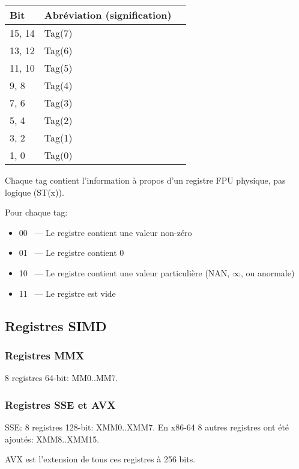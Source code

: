 \begin{center}
\begin{tabular}{ | l | l | l | }
\hline
Bit & Abréviation (signification) \\
\hline
15, 14 & Tag(7) \\
\hline
13, 12 & Tag(6) \\
\hline
11, 10 & Tag(5) \\
\hline
9, 8 & Tag(4) \\
\hline
7, 6 & Tag(3) \\
\hline
5, 4 & Tag(2) \\
\hline
3, 2 & Tag(1) \\
\hline
1, 0 & Tag(0) \\
\hline
\end{tabular}
\end{center}

Chaque tag contient l'information à propos d'un registre FPU physique, pas logique (ST(x)).

Pour chaque tag:

\begin{itemize}
\item 00 ~--- Le registre contient une valeur non-zéro
\item 01 ~--- Le registre contient 0
\item 10 ~--- Le registre contient une valeur particulière (\ac{NAN}, $\infty$, ou anormale)
\item 11 ~--- Le registre est vide
\end{itemize}

\subsection{Registres SIMD}

\subsubsection{Registres MMX}

8 registres 64-bit: MM0..MM7.

\subsubsection{Registres SSE et AVX}

SSE: 8 registres 128-bit: XMM0..XMM7.
En x86-64 8 autres registres ont été ajoutés: XMM8..XMM15.

AVX est l'extension de tous ces registres à 256 bits.



